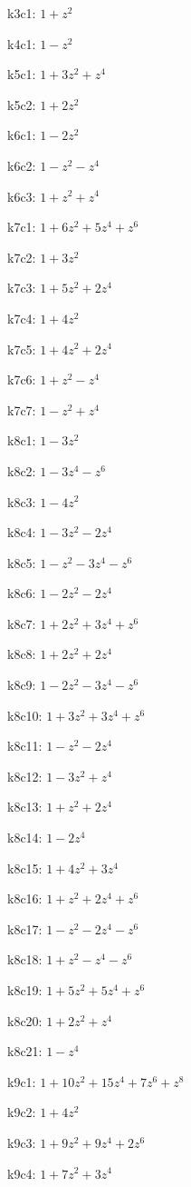 k3c1: $ 1+z^{2} $ 

k4c1: $ 1-z^{2} $ 

k5c1: $ 1+3z^{2}+z^{4} $ 

k5c2: $ 1+2z^{2} $ 

k6c1: $ 1-2z^{2} $ 

k6c2: $ 1-z^{2}-z^{4} $ 

k6c3: $ 1+z^{2}+z^{4} $ 

k7c1: $ 1+6z^{2}+5z^{4}+z^{6} $ 

k7c2: $ 1+3z^{2} $ 

k7c3: $ 1+5z^{2}+2z^{4} $ 

k7c4: $ 1+4z^{2} $ 

k7c5: $ 1+4z^{2}+2z^{4} $ 

k7c6: $ 1+z^{2}-z^{4} $ 

k7c7: $ 1-z^{2}+z^{4} $ 

k8c1: $ 1-3z^{2} $ 

k8c2: $ 1-3z^{4}-z^{6} $ 

k8c3: $ 1-4z^{2} $ 

k8c4: $ 1-3z^{2}-2z^{4} $ 

k8c5: $ 1-z^{2}-3z^{4}-z^{6} $ 

k8c6: $ 1-2z^{2}-2z^{4} $ 

k8c7: $ 1+2z^{2}+3z^{4}+z^{6} $ 

k8c8: $ 1+2z^{2}+2z^{4} $ 

k8c9: $ 1-2z^{2}-3z^{4}-z^{6} $ 

k8c10: $ 1+3z^{2}+3z^{4}+z^{6} $ 

k8c11: $ 1-z^{2}-2z^{4} $ 

k8c12: $ 1-3z^{2}+z^{4} $ 

k8c13: $ 1+z^{2}+2z^{4} $ 

k8c14: $ 1-2z^{4} $ 

k8c15: $ 1+4z^{2}+3z^{4} $ 

k8c16: $ 1+z^{2}+2z^{4}+z^{6} $ 

k8c17: $ 1-z^{2}-2z^{4}-z^{6} $ 

k8c18: $ 1+z^{2}-z^{4}-z^{6} $ 

k8c19: $ 1+5z^{2}+5z^{4}+z^{6} $ 

k8c20: $ 1+2z^{2}+z^{4} $ 

k8c21: $ 1-z^{4} $ 

k9c1: $ 1+10z^{2}+15z^{4}+7z^{6}+z^{8} $ 

k9c2: $ 1+4z^{2} $ 

k9c3: $ 1+9z^{2}+9z^{4}+2z^{6} $ 

k9c4: $ 1+7z^{2}+3z^{4} $ 

